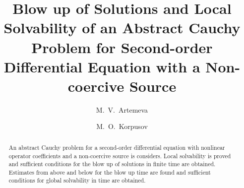 \begin{englishtitle} %
\title{Blow up of Solutions and Local Solvability of an Abstract Cauchy Problem for Second-order Differential Equation with a Non-coercive Source}
\author{M.~V.~Artemeva
  \and
  M.~O.~Korpusov
}

\maketitle

\begin{abstract}
An abstract Cauchy problem for a second-order differential equation with nonlinear operator coefficients and a non-coercive source is considers. Local solvability is proved and sufficient conditions for the blow up of solutions in finite time are obtained. Estimates from above and below for the blow up time are found and sufficient conditions for global solvability in time are obtained.

\end{abstract}
\end{englishtitle}

\iffalse
%
%


